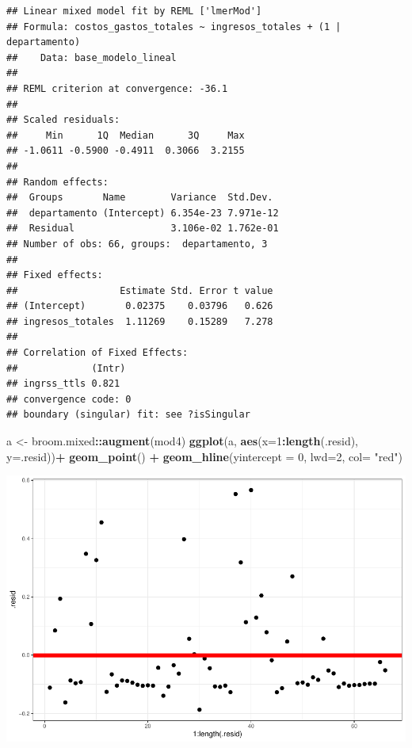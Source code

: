 \documentclass[
  11pt,
  a4paper,
]{book}
\newenvironment{Shaded}{\begin{snugshade}}{\end{snugshade}}
\newcommand{\DataTypeTok}[1]{\textcolor[rgb]{0.13,0.29,0.53}{#1}}
\newcommand{\DecValTok}[1]{\textcolor[rgb]{0.00,0.00,0.81}{#1}}
\newcommand{\KeywordTok}[1]{\textcolor[rgb]{0.13,0.29,0.53}{\textbf{#1}}}
\newcommand{\NormalTok}[1]{#1}
\newcommand{\OperatorTok}[1]{\textcolor[rgb]{0.81,0.36,0.00}{\textbf{#1}}}
\newcommand{\StringTok}[1]{\textcolor[rgb]{0.31,0.60,0.02}{#1}}
\begin{document}
\begin{verbatim}
## Linear mixed model fit by REML ['lmerMod']
## Formula: costos_gastos_totales ~ ingresos_totales + (1 | departamento)
##    Data: base_modelo_lineal
## 
## REML criterion at convergence: -36.1
## 
## Scaled residuals: 
##     Min      1Q  Median      3Q     Max 
## -1.0611 -0.5900 -0.4911  0.3066  3.2155 
## 
## Random effects:
##  Groups       Name        Variance  Std.Dev. 
##  departamento (Intercept) 6.354e-23 7.971e-12
##  Residual                 3.106e-02 1.762e-01
## Number of obs: 66, groups:  departamento, 3
## 
## Fixed effects:
##                  Estimate Std. Error t value
## (Intercept)       0.02375    0.03796   0.626
## ingresos_totales  1.11269    0.15289   7.278
## 
## Correlation of Fixed Effects:
##             (Intr)
## ingrss_ttls 0.821 
## convergence code: 0
## boundary (singular) fit: see ?isSingular
\end{verbatim}

\begin{Shaded}
\begin{Highlighting}[]
\NormalTok{a <-}\StringTok{ }\NormalTok{broom.mixed}\OperatorTok{::}\KeywordTok{augment}\NormalTok{(mod4) }
\KeywordTok{ggplot}\NormalTok{(a, }\KeywordTok{aes}\NormalTok{(}\DataTypeTok{x=}\DecValTok{1}\OperatorTok{:}\KeywordTok{length}\NormalTok{(.resid), }\DataTypeTok{y=}\NormalTok{.resid))}\OperatorTok{+}
\StringTok{  }\KeywordTok{geom_point}\NormalTok{() }\OperatorTok{+}\StringTok{ }
\StringTok{  }\KeywordTok{geom_hline}\NormalTok{(}\DataTypeTok{yintercept =} \DecValTok{0}\NormalTok{, }\DataTypeTok{lwd=}\DecValTok{2}\NormalTok{, }\DataTypeTok{col=} \StringTok{"red"}\NormalTok{)}
\end{Highlighting}
\end{Shaded}

\includegraphics{index_files/figure-latex/unnamed-chunk-24-1.pdf}
\end{document}
